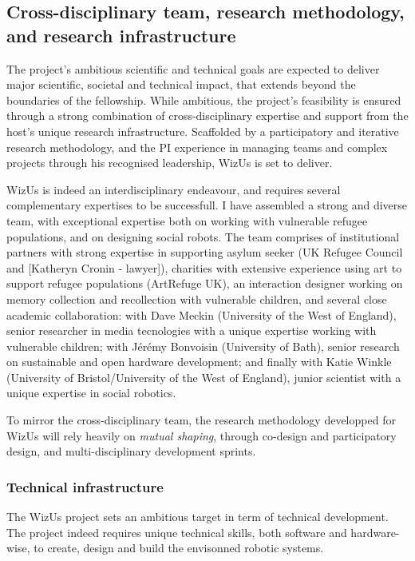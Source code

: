 \documentclass[11pt]{article}
\newcommand{\project}{WizUs\xspace}
\begin{document}
\subsection{Cross-disciplinary team, research methodology, and research
infrastructure}

The project's ambitious scientific and technical goals are expected to deliver
major scientific, societal and technical impact, that extends beyond the
boundaries of the fellowship. While ambitious, the project's feasibility is
ensured through a strong combination of cross-disciplinary expertise and
support from the host's unique research infrastructure. Scaffolded by a
participatory and iterative research methodology, and the PI experience in
managing teams and complex projects through his recognised leadership, \project
is set to deliver.

\project is indeed an interdisciplinary endeavour, and requires several
complementary expertises to be successfull. I have assembled a strong and
diverse team, with exceptional expertise both on working with vulnerable refugee
populations, and on designing social robots. The team comprises of institutional
partners with strong expertise in supporting asylum seeker (UK Refugee Council
and [Katheryn Cronin - lawyer]), charities with extensive experience using art
to support refugee populations (ArtRefuge UK), an interaction designer working
on memory collection and recollection with vulnerable children, and several
close academic collaboration: with Dave Meckin (University of the West of
England), senior researcher in media tecnologies with a unique expertise working
with vulnerable children; with Jérémy Bonvoisin (University of Bath), senior
research on sustainable and open hardware development; and finally with Katie
Winkle (University of Bristol/University of the West of England), junior
scientist with a unique expertise in social robotics.

To mirror the cross-disciplinary team, the research methodology developped for
\project will rely heavily on \emph{mutual shaping}, through co-design and
participatory design, and multi-disciplinary development sprints.

\subsubsection{Technical infrastructure}

The \project project sets an ambitious target in term of technical development.
The project indeed requires unique technical skills, both software and
hardware-wise, to create, design and build the envisonned robotic systems.
\end{document}
